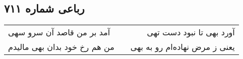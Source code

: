 \begin{center}
\section*{رباعی شماره ۷۱۱}
\label{sec:sh711}
\begin{longtable}{l p{0.5cm} r}
آمد بر من قاصد آن سرو سهی
&&
آورد بهی تا نبود دست تهی
\\
من هم رخ خود بدان بهی مالیدم
&&
یعنی ز مرض نهاده‌ام رو به بهی
\\
\end{longtable}
\end{center}
